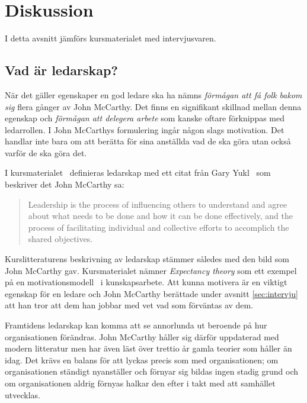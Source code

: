 \section{Diskussion}

I detta avsnitt jämförs kursmaterialet med intervjusvaren.

\subsection{Vad är ledarskap?}
När det gäller egenskaper en god ledare ska ha nämns \textit{förmågan att få folk bakom sig} flera gånger av John McCarthy. Det finns en signifikant skillnad mellan denna egenskap och \textit{förmågan att delegera arbete} som kanske oftare förknippas med ledarrollen. I John McCarthys formulering ingår någon slags motivation. Det handlar inte bara om att berätta för sina anställda vad de ska göra utan också varför de ska göra det.

I kursmaterialet~\citep{leadership} definieras ledarskap med ett citat från Gary Yukl~\citep{yukl} som beskriver det John McCarthy sa:
\begin{quote}
Leadership is the process of influencing others to understand 
and agree about what needs to be done and how it can be 
done effectively, and the process of facilitating individual and 
collective efforts to accomplich the shared objectives.
\end{quote}

Kurslitteraturens beskrivning av ledarskap stämmer således med den bild som John McCarthy gav. Kursmaterialet nämner \textit{Expectancy theory} som ett exempel på en motivationsmodell~\cite{motivation} i kunskapsarbete. Att kunna motivera är en viktigt egenskap för en ledare och John McCarthy berättade under avsnitt \ref{sec:intervju} att han tror att dem han jobbar med vet vad som förväntas av dem.

Framtidens ledarskap kan komma att se annorlunda ut beroende på hur organisationen förändras. John McCarthy håller sig därför uppdaterad med modern litteratur men har även läst över trettio år gamla teorier som håller än idag. Det krävs en balans för att lyckas precis som med organisationen; om organisationen ständigt nyanställer och förnyar sig bildas ingen stadig grund och om organisationen aldrig förnyas halkar den efter i takt med att samhället utvecklas.

